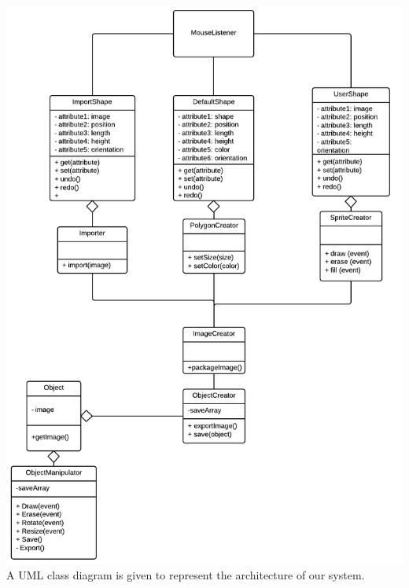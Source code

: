 \documentclass[a4paper, 11pt]{article} %
\begin{document}
\includegraphics[scale=0.52]{ClassDiagramObjectModule}\\
A UML class diagram is given to represent the architecture of our system.\\
\end{document}
